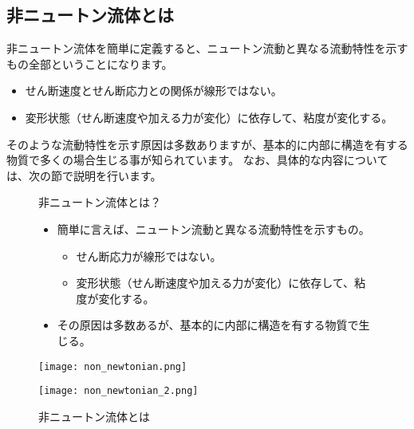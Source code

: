\documentclass[uplatex,dvipdfmx,a4paper,11pt]{jsreport}
\begin{document}
\subsection{非ニュートン流体とは}

非ニュートン流体を簡単に定義すると、ニュートン流動と異なる流動特性を示すもの全部ということになります。
\begin{itemize}
	\item せん断速度とせん断応力との関係が線形ではない。
	\item 変形状態（せん断速度や加える力が変化）に依存して、粘度が変化する。
\end{itemize}

そのような流動特性を示す原因は多数ありますが、基本的に内部に構造を有する物質で多くの場合生じる事が知られています。
なお、具体的な内容については、次の節で説明を行います。

\begin{figure}[htb]
	\begin{center}
		\begin{minipage}{0.9\textwidth}
			\begin{itembox}[l]{非ニュートン流体とは？}
				\begin{itemize}
					\item 簡単に言えば、ニュートン流動と異なる流動特性を示すもの。
					\begin{itemize}
						\item せん断応力が線形ではない。
						\item 変形状態（せん断速度や加える力が変化）に依存して、粘度が変化する。
					\end{itemize}
					\item その原因は多数あるが、基本的に内部に構造を有する物質で生じる。
				\end{itemize}
			\end{itembox}
		\end{minipage}
		\begin{minipage}{0.45\textwidth}
			\begin{center}
			\texttt{[image: non\_newtonian.png]}
			\end{center}
		\end{minipage}
		\begin{minipage}{0.45\textwidth}
			\begin{center}
			\texttt{[image: non\_newtonian\_2.png]}
			\end{center}
		\end{minipage}
		\caption{非ニュートン流体とは}
		\label{fig:non_newtonian}
	\end{center}
\end{figure}
\end{document}
